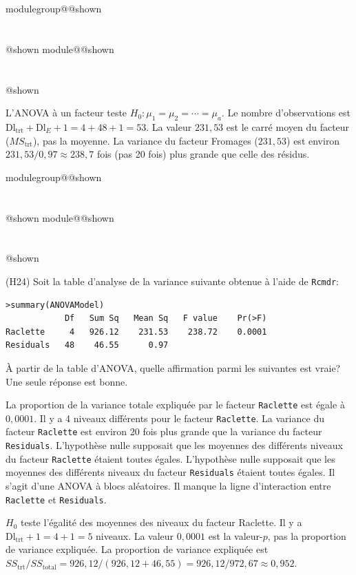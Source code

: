 \documentclass{Evaluation}
\makeatletter
\newcommand{\currentmodulekey}{}
\newcommand{\currentmoduletitle}{}
\newcommand{\currentgroupkey}{}
\newcommand{\currentgrouptitle}{}
\newcommand{\showmoduleifneeded}{%
  \ifx\currentgroupkey\empty\else
    \expandafter\ifx\csname modulegroup@\currentgroupkey @shown\endcsname\relax
      \section*{\currentgrouptitle}%
      \expandafter\gdef\csname modulegroup@\currentgroupkey @shown\endcsname{1}%
    \fi
  \fi
  \expandafter\ifx\csname module@\currentmodulekey @shown\endcsname\relax
    \section*{\currentmoduletitle}%
    \expandafter\gdef\csname module@\currentmodulekey @shown\endcsname{1}%
  \fi
}
\newenvironment{A23}{\showmoduleifneeded}{}
\newenvironment{H24}{\showmoduleifneeded}{}
\makeatother
\begin{document}
\begin{questions}
\begin{A23}
\begin{solution}
L'ANOVA à un facteur teste $H_0\!: \mu_1=\mu_2=\cdots=\mu_a$. Le nombre d'observations est $\text{Dl}_{\text{trt}}+\text{Dl}_E+1 = 4+48+1 = 53$. La valeur $231{,}53$ est le carré moyen du facteur ($MS_{\text{trt}}$), pas la moyenne. La variance du facteur Fromages ($231{,}53$) est environ $231{,}53/0{,}97 \approx 238{,}7$ fois (pas 20 fois) plus grande que celle des résidus.
\end{solution}
\end{A23}

\begin{H24}
\question (H24) Soit la table d'analyse de la variance suivante obtenue à l'aide de \texttt{Rcmdr}:
\begin{verbatim}
>summary(ANOVAModel)
            Df   Sum Sq   Mean Sq   F value    Pr(>F)    
Raclette     4   926.12    231.53    238.72    0.0001 
Residuals   48    46.55      0.97                      
\end{verbatim}

À partir de la table d'ANOVA, quelle affirmation parmi les suivantes est vraie? Une seule réponse est bonne.

\begin{checkboxes}
\choice La proportion de la variance totale expliquée par le facteur \texttt{Raclette} est égale à $0,0001$. 
\choice Il y a 4 niveaux différents pour le facteur \texttt{Raclette}.
\choice La variance du facteur \texttt{Raclette} est environ 20 fois plus grande que la variance du facteur \texttt{Residuals}.
\correctchoice L'hypothèse nulle supposait que les moyennes des différents niveaux du facteur \texttt{Raclette} étaient toutes égales.
\choice L'hypothèse nulle supposait que les moyennes des différents niveaux du facteur \texttt{Residuals} étaient toutes égales.
\choice Il s'agit d'une ANOVA à blocs aléatoires.
\choice Il manque la ligne d'interaction entre \texttt{Raclette} et \texttt{Residuals}.
\end{checkboxes}

\begin{solution}
$H_0$ teste l'égalité des moyennes des niveaux du facteur Raclette. Il y a $\text{Dl}_{\text{trt}}+1 = 4+1 = 5$ niveaux. La valeur $0{,}0001$ est la valeur-$p$, pas la proportion de variance expliquée. La proportion de variance expliquée est $SS_{\text{trt}}/SS_{\text{total}} = 926{,}12/(926{,}12+46{,}55) = 926{,}12/972{,}67 \approx 0{,}952$.
\end{solution}
\end{H24}


\end{questions}
\end{document}
